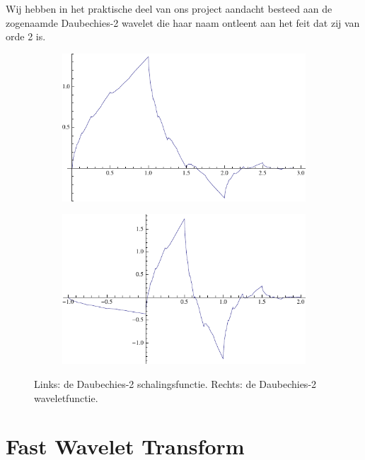 \documentclass[11pt]{uvamath}
\theoremstyle{plain}
\theoremstyle{definition}
\theoremstyle{remark}
\begin{document}
Wij hebben in het praktische deel van ons project aandacht besteed aan de zogenaamde Daubechies-2 wavelet die haar naam ontleent aan het feit dat zij van orde 2 is.

\begin{figure}[h]
  \centering
  \begin{subfigure}{0.48\linewidth}
    \includegraphics[width=\linewidth]{plaatjes/db2_phi.pdf}
  \end{subfigure}
  \begin{subfigure}{0.48\linewidth}
    \includegraphics[width=\linewidth]{plaatjes/db2_psi.pdf}
  \end{subfigure}
  \caption{Links: de Daubechies-2 schalingsfunctie. Rechts: de Daubechies-2 waveletfunctie.}
\end{figure}

\section{Fast Wavelet Transform}
\end{document}
